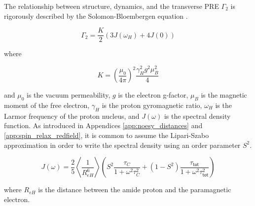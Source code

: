 \documentclass[9pt,review,pubversion]{livecoms}
\begin{document}
The relationship between structure, dynamics, and the transverse PRE $\Gamma_2$ is rigorously described by the Solomon-Bloembergen equation \cite{solomon_nuclear_1956}.

\begin{equation}
\label{eqn:solomon-bloembergen}
\Gamma_2 = \frac {K} {2} \left( 3 J(\omega_H) + 4 J(0) \right)
\end{equation}

\noindent where

\begin{equation}
\label{eqn:pre_constant}
K = \left( \frac {\mu_0} {4 \pi} \right)^2 \frac {\gamma_H^2 g^2 \mu_B^2} {4}
\end{equation}

\noindent and $\mu_0$ is the vacuum permeability, $g$ is the electron g-factor, $\mu_B$ is the magnetic moment of the free electron, $\gamma_H$ is the proton gyromagnetic ratio, $\omega_H$ is the Larmor frequency of the proton nucleus, and $J(\omega)$ is the spectral density function.
As introduced in Appendices \ref{app:noesy_distances} and \ref{app:spin_relax_redfield}, it is common to assume the Lipari-Szabo approximation \cite{lipari_model-free_1982} in order to write the spectral density using an order parameter $S^2$.

\begin{equation}
\label{eqn:pre_spectral_density}
J(\omega) = \frac {2} {5} \left \langle \frac {1} {R_{eH}^6} \right \rangle \left( S^2 \frac {\tau_C} {1 + \omega^2 \tau_C^2} + \left( 1 - S^2 \right) \frac {\tau_{\mathsf{tot}}} {1 + \omega^2 \tau_{\mathsf{tot}}^2} \right)
\end{equation}

\noindent where $R_{eH}$ is the distance between the amide proton and the paramagnetic electron.
\end{document}
